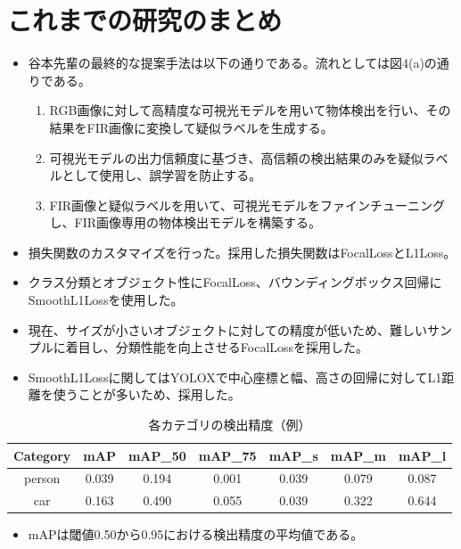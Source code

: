 \documentclass[a4j]{jarticle}
\begin{document}
	\section{これまでの研究のまとめ}
	\begin{itemize}
		\item 谷本先輩の最終的な提案手法は以下の通りである。流れとしては図4(a)の通りである。
		\begin{enumerate}
			\item RGB画像に対して高精度な可視光モデルを用いて物体検出を行い、その結果をFIR画像に変換して疑似ラベルを生成する。
			\item 可視光モデルの出力信頼度に基づき、高信頼の検出結果のみを疑似ラベルとして使用し、誤学習を防止する。
			\item FIR画像と疑似ラベルを用いて、可視光モデルをファインチューニングし、FIR画像専用の物体検出モデルを構築する。
		\end{enumerate}
	\end{itemize}
	\begin{itemize}
		\item 損失関数のカスタマイズを行った。採用した損失関数はFocalLossとL1Loss。
		\item クラス分類とオブジェクト性にFocalLoss、バウンディングボックス回帰にSmoothL1Lossを使用した。
		\item 現在、サイズが小さいオブジェクトに対しての精度が低いため、難しいサンプルに着目し、分類性能を向上させるFocalLossを採用した。
		\item SmoothL1Lossに関してはYOLOXで中心座標と幅、高さの回帰に対してL1距離を使うことが多いため、採用した。
	\end{itemize}
	\begin{table}[htbp]
		\centering
		\begin{tabular}{|c|c|c|c|c|c|c|}
			\hline
			\textbf{Category} & \textbf{mAP} & \textbf{mAP\_50} & \textbf{mAP\_75} & \textbf{mAP\_s} & \textbf{mAP\_m} & \textbf{mAP\_l} \\
			\hline
			person & 0.039 & 0.194 & 0.001 & 0.039 & 0.079 & 0.087 \\
			car    & 0.163 & 0.490 & 0.055 & 0.039 & 0.322 & 0.644 \\
			\hline
		\end{tabular}
		\caption{各カテゴリの検出精度（例）}
	\end{table}
	\begin{itemize}
		\item mAPは閾値0.50から0.95における検出精度の平均値である。
	\end{itemize}
\end{document}
